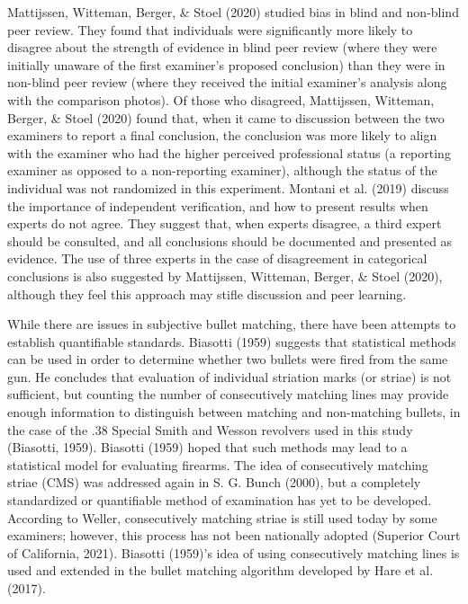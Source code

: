 \documentclass[print]{nuthesis}
\begin{document}
Mattijssen, Witteman, Berger, \& Stoel (2020) studied bias in blind and non-blind peer review.
They found that individuals were significantly more likely to disagree about the strength of evidence in blind peer review (where they were initially unaware of the first examiner's proposed conclusion) than they were in non-blind peer review (where they received the initial examiner's analysis along with the comparison photos).
Of those who disagreed, Mattijssen, Witteman, Berger, \& Stoel (2020) found that, when it came to discussion between the two examiners to report a final conclusion, the conclusion was more likely to align with the examiner who had the higher perceived professional status (a reporting examiner as opposed to a non-reporting examiner), although the status of the individual was not randomized in this experiment.
Montani et al. (2019) discuss the importance of independent verification, and how to present results when experts do not agree.
They suggest that, when experts disagree, a third expert should be consulted, and all conclusions should be documented and presented as evidence.
The use of three experts in the case of disagreement in categorical conclusions is also suggested by Mattijssen, Witteman, Berger, \& Stoel (2020), although they feel this approach may stifle discussion and peer learning.

While there are issues in subjective bullet matching, there have been attempts to establish quantifiable standards.
Biasotti (1959) suggests that statistical methods can be used in order to determine whether two bullets were fired from the same gun.
He concludes that evaluation of individual striation marks (or striae) is not sufficient, but counting the number of consecutively matching lines may provide enough information to distinguish between matching and non-matching bullets, in the case of the .38 Special Smith and Wesson revolvers used in this study (Biasotti, 1959).
Biasotti (1959) hoped that such methods may lead to a statistical model for evaluating firearms.
The idea of consecutively matching striae (CMS) was addressed again in S. G. Bunch (2000), but a completely standardized or quantifiable method of examination has yet to be developed.
According to Weller, consecutively matching striae is still used today by some examiners; however, this process has not been nationally adopted (Superior Court of California, 2021).
Biasotti (1959)'s idea of using consecutively matching lines is used and extended in the bullet matching algorithm developed by Hare et al. (2017).
\end{document}
